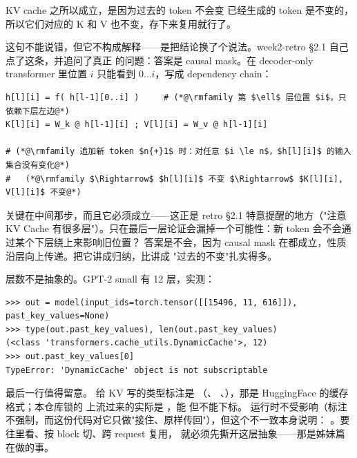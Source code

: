 \begin{misconception}{KV cache 之所以成立，是因为过去的 token 不会变}
已经生成的 token 是不变的，所以它们对应的 K 和 V 也不变，存下来复用就行了。
\end{misconception}

这句不能说错，但它不构成解释——是把结论换了个说法。week2-retro §2.1 自己点了这条，并追问了真正
的问题：答案是 causal mask。在 decoder-only
transformer 里位置 $i$ 只能看到 $0 \ldots i$，写成 dependency chain：

\begin{lstlisting}[style=hlplain]
h[l][i] = f( h[l-1][0..i] )     # (*@\rmfamily 第 $\ell$ 层位置 $i$，只依赖下层左边@*)
K[l][i] = W_k @ h[l-1][i] ; V[l][i] = W_v @ h[l-1][i]

# (*@\rmfamily 追加新 token $n{+}1$ 时：对任意 $i \le n$，$h[l][i]$ 的输入集合没有变化@*)
#   (*@\rmfamily $\Rightarrow$ $h[l][i]$ 不变 $\Rightarrow$ $K[l][i], V[l][i]$ 不变@*)
\end{lstlisting}

关键在中间那步，而且它必须成立——这正是 retro §2.1 特意提醒的地方（"注意 KV Cache
有很多层"）。只在最后一层论证会漏掉一个可能性：新 token 会不会通过某个下层绕上来影响旧位置？
答案是不会，因为 causal mask 在都成立，性质沿层向上传递。把它讲成归纳，比讲成
"过去的不变"扎实得多。

层数不是抽象的。GPT-2 small 有 12 层，实测：

\begin{lstlisting}[style=hlrepl]
>>> out = model(input_ids=torch.tensor([[15496, 11, 616]]), past_key_values=None)
>>> type(out.past_key_values), len(out.past_key_values)
(<class 'transformers.cache_utils.DynamicCache'>, 12)
>>> out.past_key_values[0]
TypeError: 'DynamicCache' object is not subscriptable
\end{lstlisting}

最后一行值得留意。 给 KV 写的类型标注是
（、
、），那是 HuggingFace 的缓存格式；本仓库锁的
 上流过来的实际是 ，能  但不能下标。
运行时不受影响（标注不强制，而这份代码对它只做"接住、原样传回"），但这个不一致本身说明：
。要往里看、按 block 切、跨 request 复用，
就必须先撕开这层抽象——那是姊妹篇在做的事。

